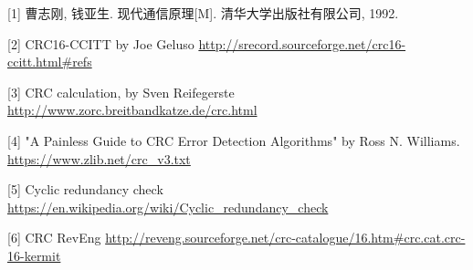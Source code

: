\documentclass[
]{article}
\begin{document}
{[}1{]} 曹志刚, 钱亚生. 现代通信原理{[}M{]}. 清华大学出版社有限公司,
1992.

{[}2{]} CRC16-CCITT by Joe Geluso
\url{http://srecord.sourceforge.net/crc16-ccitt.html#refs}

{[}3{]} CRC calculation, by Sven Reifegerste
\url{http://www.zorc.breitbandkatze.de/crc.html}

{[}4{]} "A Painless Guide to CRC Error Detection Algorithms" by Ross N.
Williams. \url{https://www.zlib.net/crc_v3.txt}

{[}5{]} Cyclic redundancy check
\url{https://en.wikipedia.org/wiki/Cyclic_redundancy_check}

{[}6{]} CRC RevEng
\url{http://reveng.sourceforge.net/crc-catalogue/16.htm#crc.cat.crc-16-kermit}
\end{document}
